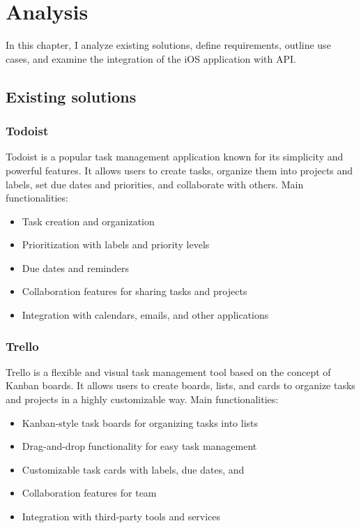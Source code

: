 \documentclass[
  biblatex,
  language=english,
  figures=false,
  sourcecodes,
  glossaries,
  index
]{kidiplom}
\begin{document}
\section{Analysis}
In this chapter, I analyze existing solutions, define requirements, outline use cases, and examine the integration of the iOS application with API.

\subsection{Existing solutions}
\subsubsection{Todoist}
Todoist is a popular task management application known for its simplicity and powerful features. It allows users to create tasks, organize them into projects and labels, set due dates and priorities, and collaborate with others. Main functionalities:
\begin{itemize}
	\item Task creation and organization
	\item Prioritization with labels and priority levels
	\item Due dates and reminders
	\item Collaboration features for sharing tasks and projects
	\item Integration with calendars, emails, and other applications
\end{itemize}

\subsubsection{Trello}
Trello is a flexible and visual task management tool based on the concept of Kanban boards. It allows users to create boards, lists, and cards to organize tasks and projects in a highly customizable way. Main functionalities:
\begin{itemize}
	\item Kanban-style task boards for organizing tasks into lists
	\item Drag-and-drop functionality for easy task management
	\item Customizable task cards with labels, due dates, and 
	\item Collaboration features for team 
	\item Integration with third-party tools and services
 \end{itemize}
\end{document}
